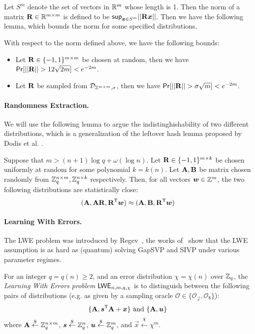Let $S^m$ denote the set of vectors in $\mathbb{R}^{m}$ whose length is 1. Then the norm of a matrix $\mathbf{R} \in \mathbb{R}^{m \times m}$ is defined to be $\mathsf{sup}_{\boldsymbol{x} \in S^m} ||\mathbf{R} \boldsymbol{x}||$. Then we have the following lemma, which bounds the norm for some specified distributions.

\begin{lemma}\label{lem:bound}
With respect to the norm defined above, we have the following bounds:
\begin{itemize}
 \item Let $\mathbf{R} \in \{-1, 1\}^{m \times m}$ be chosen at random, then we have $\mathsf{Pr}[||\mathbf{R}|| > 12 \sqrt{2m}] < e^{-2m}$.
 \item Let $\mathbf{R}$ be sampled from $\mathcal{D}_{\mathbb{Z}^{m \times m}, \sigma}$, then we have $\mathsf{Pr} [||\mathbf{R}|| > \sigma \sqrt{m}] < e^{-2m}$.
\end{itemize}
\end{lemma}


\paragraph{Randomness Extraction.} We will use the following lemma to argue the indistinghishability of two different distributions, which is a generalization of the leftover hash lemma proposed by Dodis et al. \cite{EC:DodReySmi04}.

\begin{lemma} \label{lem:lhl}
Suppose that $m > (n + 1) \log q + \omega(\log n)$. Let $\mathbf{R} \in \{-1, 1\}^{m \times k}$ be chosen uniformly at random for some polynomial $k = k(n)$. Let $\mathbf{A}, \mathbf{B}$ be matrix chosen randomly from $\mathbb{Z}^{n \times m}_q, \mathbb{Z}^{n \times k}_q$ respectively. Then, for all vectors $\boldsymbol{w} \in \mathbb{Z}^m$, the two following distributions are statistically close:
$$(\mathbf{A}, \mathbf{A} \mathbf{R}, \mathbf{R}^{\mathsf{T}} \boldsymbol{w}) \approx (\mathbf{A}, \mathbf{B}, \mathbf{R}^{\mathsf{T}} \boldsymbol{w})$$
\end{lemma}

\paragraph{Learning With Errors.} The LWE problem was introduced by Regev~\cite{STOC:Regev05}, the works of~\cite{STOC:Regev05,STOC:Peikert09,STOC:BLPRS13} show that the LWE assumption is as hard as (quantum)
solving GapSVP and SIVP under various parameter regimes.
\begin{definition}[LWE]\label{defn:lwe}
For an integer $q = q(n) \geq 2$, and an error distribution $\chi = \chi(n)$ over $\mathbb{Z}_q$, the \emph{Learning With Errors problem $\mathsf{LWE}_{n, m, q, \chi}$} is to distinguish between the following pairs of distributions (e.g. as given by a sampling oracle $\mathcal{O}\in\{\mathcal{O}_{\vec{s}}, \mathcal{O}_{\$}\}$):
$$\{\mathbf{A}, \boldsymbol{s}^{\mathsf{T}} \mathbf{A} + \boldsymbol{x}\} \  \text{and} \ \{\mathbf{A}, \boldsymbol{u}\}$$
where $\mathbf{A} \overset{\$}{\leftarrow}\mathbb{Z}^{n \times m}_q$, $\boldsymbol{s} \overset{\$}{\leftarrow} \mathbb{Z}^n_q$, $\boldsymbol{u} \overset{\$}{\leftarrow} \mathbb{Z}^m_q$, and $\vec{x} \overset{\$}{\leftarrow} \chi^m$.
\end{definition}


